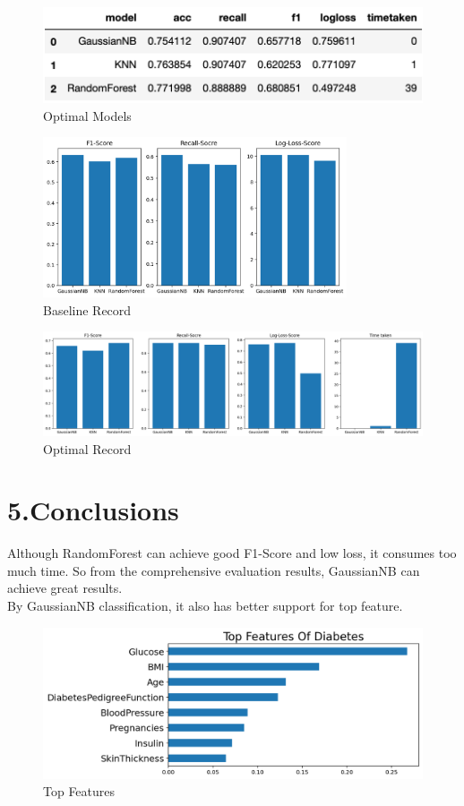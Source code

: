 \documentclass[11pt]{article}
\begin{document}
\begin{figure}[H]
    \centering
    \includegraphics[width=1\textwidth]{threeopt}
    \caption{Optimal Models}
\end{figure}

\begin{figure}[H]
    \centering
    \includegraphics[width=0.8\textwidth]{br}
    \caption{Baseline Record}
\end{figure}

\begin{figure}[H]
    \centering
    \includegraphics[width=1\textwidth]{or}
    \caption{Optimal Record}
\end{figure}


\section{5.Conclusions}
Although RandomForest can achieve good F1-Score and low loss, it consumes too much time. So from the comprehensive evaluation results, GaussianNB can achieve great results.\\
By GaussianNB classification, it also has better support for top feature.
\begin{figure}[H]
    \centering
    \includegraphics[width=1\textwidth]{tpf}
    \caption{Top Features}
\end{figure}
\end{document}
